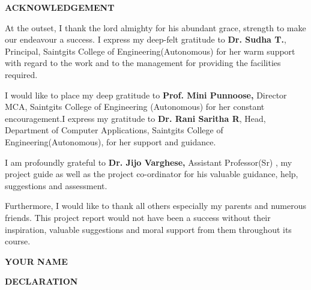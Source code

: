 \documentclass[12pt,a4paper]{report}
\begin{document}



\newpage
\thispagestyle{empty}

\begin{center}
{\fontsize{16pt}{18pt}\selectfont\textbf{ACKNOWLEDGEMENT}}

\end{center}

\vspace{1cm}

At the outset, I thank the lord almighty for his abundant grace, strength to make our endeavour a success. I express my deep-felt gratitude to \textbf{Dr. Sudha T.}, Principal, Saintgits College of Engineering(Autonomous) for her warm support with regard to the work and to the management for providing the facilities required.


I would like to place my deep gratitude to \textbf{Prof. Mini Punnoose,} Director MCA, Saintgits College of Engineering (Autonomous) for her constant encouragement.I express my gratitude to \textbf{Dr. Rani Saritha R}, Head, Department of Computer Applications, Saintgits College of Engineering(Autonomous), for her support and guidance.


I am profoundly grateful to \textbf{Dr. Jijo Varghese,} Assistant Professor(Sr) , my project guide as well as the project co-ordinator for his valuable guidance, help, suggestions and assessment.


Furthermore, I would like to thank all others especially my parents and numerous friends. This project report would not have been a success without their inspiration, valuable suggestions and moral support from them throughout its course.


\vspace{2cm}

\begin{flushright}
\textbf{YOUR NAME}
\end{flushright}

\newpage
\thispagestyle{empty}

\begin{center}
{\fontsize{16pt}{18pt}\selectfont\textbf{DECLARATION}}


\end{center}
\end{document}
